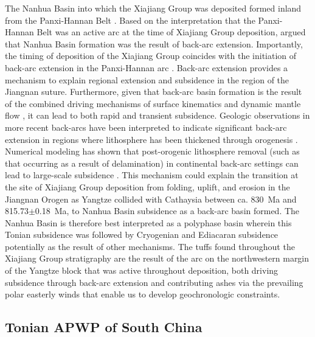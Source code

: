 The Nanhua Basin into which the Xiajiang Group was deposited formed inland from the Panxi-Hannan Belt \citep{Cawood2017a}. Based on the interpretation that the Panxi-Hannan Belt was an active arc at the time of Xiajiang Group deposition, \citet{Qi2019a} argued that Nanhua Basin formation was the result of back-arc extension. Importantly, the timing of deposition of the Xiajiang Group coincides with the initiation of  back-arc extension in the Panxi-Hannan arc \citep{Dong2012a}. Back-arc extension provides a mechanism to explain regional extension and subsidence in the region of the Jiangnan suture. Furthermore, given that back-arc basin formation is the result of the combined driving mechanisms of surface kinematics and dynamic mantle flow \citep{Sdrolias2006a}, it can lead to both rapid and transient subsidence. Geologic observations in more recent back-arcs have been interpreted to indicate significant back-arc extension in regions where lithosphere has been thickened through orogenesis \citep{Gogus2015a}. Numerical modeling has shown that post-orogenic lithosphere removal (such as that occurring as a result of delamination) in continental back-arc settings can lead to large-scale subsidence \citep{Gogus2015a}. This mechanism could explain the transition at the site of Xiajiang Group deposition from folding, uplift, and erosion in the Jiangnan Orogen as Yangtze collided with Cathaysia between ca. 830~Ma and 815.73$\pm$0.18~Ma, to Nanhua Basin subsidence as a back-arc basin formed. The Nanhua Basin is therefore best interpreted as a polyphase basin wherein this Tonian subsidence was followed by Cryogenian and Ediacaran subsidence potentially as the result of other mechanisms. The tuffs found throughout the Xiajiang Group stratigraphy are the result of the arc on the northwestern margin of the Yangtze block that was active throughout deposition, both driving subsidence through back-arc extension and contributing ashes via the prevailing polar easterly winds that enable us to develop geochronologic constraints.

\subsection{Tonian APWP of South China}

